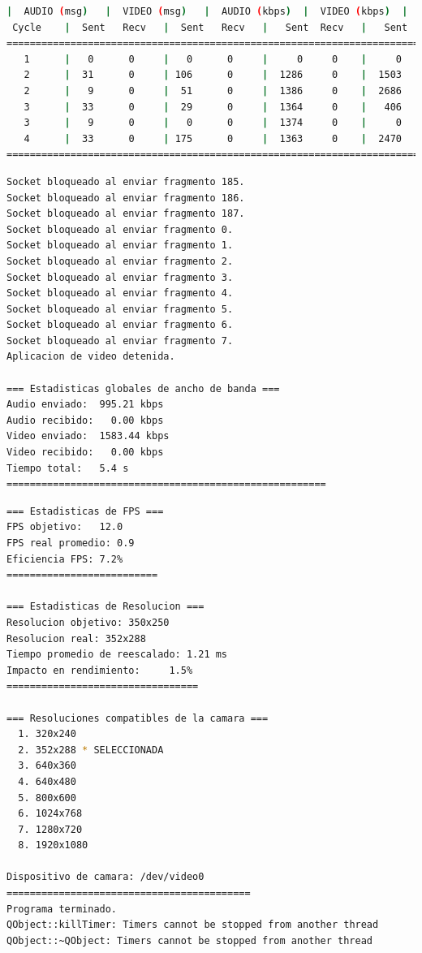 \begin{lstlisting}[language=bash,basicstyle=\ttfamily\scriptsize]
          |  AUDIO (msg)   |  VIDEO (msg)   |  AUDIO (kbps)  |  VIDEO (kbps)  |   CPU (%)
 Cycle    |  Sent   Recv   |  Sent   Recv   |   Sent  Recv   |   Sent  Recv   | Program System
============================================================================================
   1      |   0      0     |   0      0     |     0     0    |     0     0    |   0      0
   2      |  31      0     | 106      0     |  1286     0    |  1503     0    |  29     63
   2      |   9      0     |  51      0     |  1386     0    |  2686     0    |  32     65
   3      |  33      0     |  29      0     |  1364     0    |   406     0    |  42     70
   3      |   9      0     |   0      0     |  1374     0    |     0     0    |  46     72
   4      |  33      0     | 175      0     |  1363     0    |  2470     0    |  42     70
============================================================================================
\end{lstlisting}

\begin{lstlisting}[language=bash,basicstyle=\ttfamily\scriptsize]
Socket bloqueado al enviar fragmento 185.
Socket bloqueado al enviar fragmento 186.
Socket bloqueado al enviar fragmento 187.
Socket bloqueado al enviar fragmento 0.
Socket bloqueado al enviar fragmento 1.
Socket bloqueado al enviar fragmento 2.
Socket bloqueado al enviar fragmento 3.
Socket bloqueado al enviar fragmento 4.
Socket bloqueado al enviar fragmento 5.
Socket bloqueado al enviar fragmento 6.
Socket bloqueado al enviar fragmento 7.
Aplicacion de video detenida.

=== Estadisticas globales de ancho de banda ===
Audio enviado:	995.21 kbps
Audio recibido:   0.00 kbps
Video enviado:	1583.44 kbps
Video recibido:   0.00 kbps
Tiempo total: 	5.4 s
=======================================================
\end{lstlisting}

\begin{lstlisting}[language=bash,basicstyle=\ttfamily\scriptsize]
=== Estadisticas de FPS ===
FPS objetivo: 	12.0
FPS real promedio: 0.9
Eficiencia FPS:	7.2%
==========================

=== Estadisticas de Resolucion ===
Resolucion objetivo: 350x250
Resolucion real: 352x288
Tiempo promedio de reescalado: 1.21 ms
Impacto en rendimiento:    	1.5%
=================================

=== Resoluciones compatibles de la camara ===
  1. 320x240
  2. 352x288 * SELECCIONADA
  3. 640x360
  4. 640x480
  5. 800x600
  6. 1024x768
  7. 1280x720
  8. 1920x1080

Dispositivo de camara: /dev/video0
==========================================
Programa terminado.
QObject::killTimer: Timers cannot be stopped from another thread
QObject::~QObject: Timers cannot be stopped from another thread
\end{lstlisting}
\vspace{\baselineskip}

